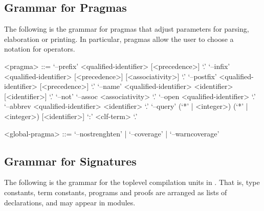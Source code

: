 \subsection{Grammar for Pragmas}\label{section:syntax-pragmas}

The following is the grammar for pragmas that adjust parameters for parsing, elaboration or printing.
In particular, pragmas allow the user to choose a notation for operators.

\begin{grammar}
<pragma> ::= `--prefix' <qualified-identifier> [<precedence>] `.'
\alt `--infix' <qualified-identifier> [<precedence>] [<associativity>] `.'
\alt `--postfix' <qualified-identifier> [<precedence>] `.'
\alt `--name' <qualified-identifier> <identifier> [<identifier>] `.'
\alt `--not'
\alt `--assoc <associativity> `.'
\alt `--open <qualified-identifier> `.'
\alt `--abbrev <qualified-identifier> <identifier> `.'
\alt `--query' (`*' | <integer>) (`*' | <integer>) [<identifier>] `:' <clf-term> `.'

<global-pragma> ::= `--nostrenghten' | `--coverage' | `--warncoverage'
\end{grammar}

\subsection{Grammar for \Beluga Signatures}\label{section:syntax-signature}

The following is the grammar for the toplevel compilation units in \Beluga.
That is, type constants, term constants, programs and proofs are arranged as lists of declarations, and may appear in modules.

